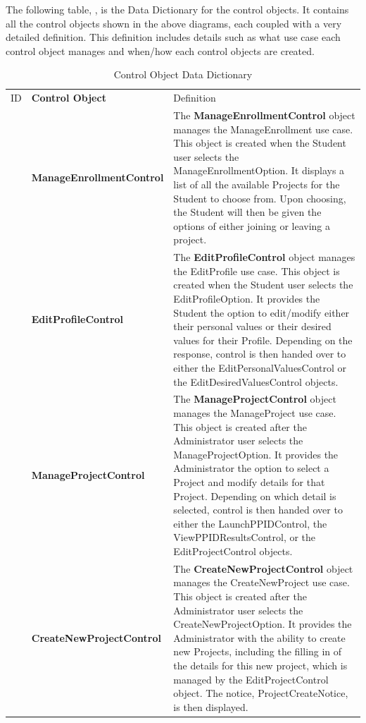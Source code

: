 \documentclass[12pt,letterpaper]{article}
\begin{document}
The following table, , is the Data Dictionary for the control objects. It contains all the control objects shown in the above diagrams, each coupled with a very detailed definition. 
This definition includes details such as what use case each control object manages and when/how each control objects are created.

\begin{table}[H]
\caption{Control Object Data Dictionary}
	\begin{tabu} to 
		\tableheader{}ID & Control Object & Definition\\
		 & Manage\-Enrollment\-Control & 
			The {\bf ManageEnrollmentControl} object manages the ManageEnrollment use case. This object is created when the Student user
			selects the ManageEnrollmentOption.  It displays a list of all the available Projects for the Student to choose from. Upon choosing, the
			Student will then be given the options of either joining or leaving a project. \\
		
		 & Edit\-Profile\-Control & 
			The {\bf EditProfileControl} object manages the EditProfile use case. This object is created when the Student user selects the EditProfileOption.
			It provides the Student the option to edit/modify either their personal values or their desired values for their Profile. Depending on the response, control is then
			handed over to either the EditPersonalValuesControl or the EditDesiredValuesControl objects. \\
		
		 & Manage\-Project\-Control & 
			The {\bf ManageProjectControl} object manages the ManageProject use case. This object is created after the Administrator user selects the
			ManageProjectOption. It provides the Administrator the option to select a Project and modify details for that Project. Depending on which detail
			is selected, control is then handed over to either the LaunchPPIDControl, the ViewPPIDResultsControl, or the EditProjectControl objects.\\
		
		 & Create\-New\-Project\-Control & 
			The {\bf CreateNewProjectControl} object manages the CreateNewProject use case. This object is created after the Administrator user selects the
			CreateNewProjectOption. It provides the Administrator with the ability to create new Projects, including the filling in of the details for this new project,
			which is managed by the EditProjectControl object. The notice, ProjectCreateNotice, is then displayed.\\
		

\end{tabu}
\end{table}
\end{document}
